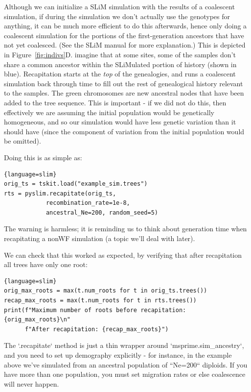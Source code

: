 \documentclass[12pt]{article}
\begin{document}
Although we can initialize a SLiM simulation with the results of a coalescent simulation,
if during the simulation we don't actually use the genotypes for anything, it
can be much more efficient to do this afterwards, hence only doing a coalescent
simulation for the portions of the first-generation ancestors that have
not yet coalesced. (See the SLiM manual for more explanation.)
This is depicted in Figure~\ref{fig:indivs}D.
imagine that at some sites, some of the samples
don't share a common ancestor within the SLiMulated portion of history (shown in blue).
Recapitation starts at the \textit{top} of the genealogies,
and runs a coalescent simulation back through time
to fill out the rest of genealogical history relevant to the samples.
The green chromosomes are new ancestral nodes that have been added to the tree sequence.
This is important - if we did not do this,
then effectively we are assuming the initial population would be genetically homogeneous,
and so our simulation would have less genetic variation than it should have
(since the component of variation from the initial population would be omitted).

Doing this is as simple as:

\begin{lstlisting}{language=slim}
orig_ts = tskit.load("example_sim.trees")
rts = pyslim.recapitate(orig_ts,
            recombination_rate=1e-8,
            ancestral_Ne=200, random_seed=5)
\end{lstlisting}
The warning is harmless; it is reminding us to think about generation time
when recapitating a nonWF simulation (a topic we'll deal with later).

We can check that this worked as expected, by verifying that after recapitation
all trees have only one root:
\begin{lstlisting}{language=slim}
orig_max_roots = max(t.num_roots for t in orig_ts.trees())
recap_max_roots = max(t.num_roots for t in rts.trees())
print(f"Maximum number of roots before recapitation: {orig_max_roots}\n"
      f"After recapitation: {recap_max_roots}")
\end{lstlisting}

The `.recapitate` method
is just a thin wrapper around `msprime.sim\_ancestry`,
and you need to set up demography explicitly - for instance, in the example above
we've simulated from an ancestral population of ``Ne=200`` diploids.
If you have more than one population,
you must set migration rates or else coalescence will never happen.
\end{document}
